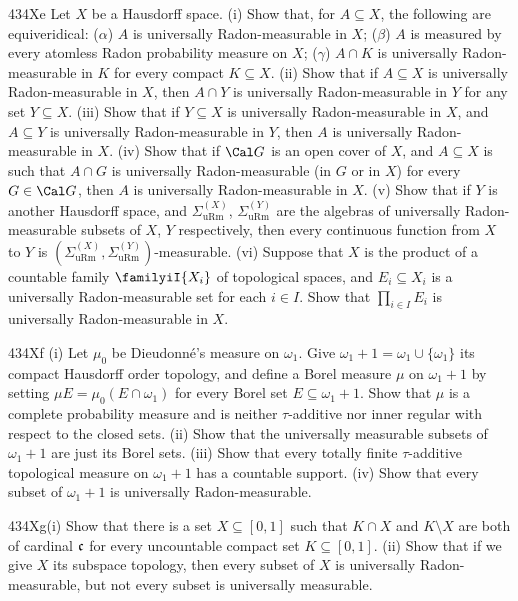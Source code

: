 {\spheader 434Xe Let $X$ be a Hausdorff space.
(i) Show that, for $A\subseteq X$, the following are equiveridical:
($\alpha$) $A$ is universally Radon-measurable in $X$;  ($\beta$) $A$ is
measured by every atomless Radon probability measure on $X$;  ($\gamma$)
$A\cap K$ is universally Radon-measurable in $K$ for every compact
$K\subseteq X$.
(ii) Show that if
$A\subseteq X$ is universally Radon-measurable in $X$, then $A\cap Y$ is
universally Radon-measurable in $Y$ for any set $Y\subseteq X$.
(iii) Show that if $Y\subseteq X$ is universally Radon-measurable in
$X$, and $A\subseteq Y$ is universally Radon-measurable in $Y$, then $A$
is universally Radon-measurable in $X$.
(iv) Show that if $\Cal G$ is an open cover of $X$, and $A\subseteq X$
is such that $A\cap G$ is universally Radon-measurable (in $G$ or in
$X$) for every $G\in\Cal G$, then $A$ is universally Radon-measurable in
$X$.
(v) Show that if $Y$ is another Hausdorff space, and
$\Sigma^{(X)}_{\text{uRm}}$, $\Sigma^{(Y)}_{\text{uRm}}$ are the
algebras of universally
Radon-measurable subsets of $X$, $Y$ respectively, then every continuous
function from $X$ to $Y$ is
$(\Sigma^{(X)}_{\text{uRm}},\Sigma^{(Y)}_{\text{uRm}})$-measurable.
(vi) Suppose that $X$ is the product of a countable family
$\familyiI{X_i}$ of
topological spaces, and $E_i\subseteq X_i$ is a universally
Radon-measurable set for each $i\in I$.   Show that $\prod_{i\in I}E_i$
is universally Radon-measurable in $X$.

\sqheader 434Xf
(i) Let $\mu_0$ be Dieudonn\'e's measure on $\omega_1$.
Give $\omega_1+1=\omega_1\cup\{\omega_1\}$ its compact Hausdorff order
topology, and define a Borel measure $\mu$ on $\omega_1+1$ by setting
$\mu E=\mu_0(E\cap\omega_1)$ for every Borel set $E\subseteq\omega_1+1$.
Show that $\mu$ is a complete probability measure and is neither
$\tau$-additive nor inner regular with respect to the closed sets.
(ii) Show that the universally measurable subsets of $\omega_1+1$ are
just its Borel sets.
   (iii) Show that every totally finite
$\tau$-additive topological measure on $\omega_1+1$ has a countable
support.   (iv) Show that every subset of $\omega_1+1$ is universally
Radon-measurable.

\spheader 434Xg(i) Show that there is a set $X\subseteq[0,1]$ such that
$K\cap X$ and $K\setminus X$ are both of cardinal $\frak c$ for every
uncountable compact set $K\subseteq[0,1]$.   
(ii) Show that if we give $X$ its subspace topology, then every subset
of $X$ is universally Radon-measurable, but not every subset is
universally measurable.   

}

